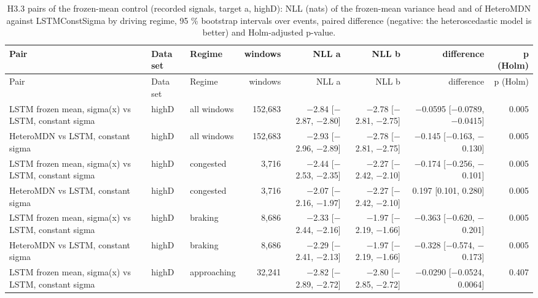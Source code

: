 \begingroup
\footnotesize
\begin{longtable}{lllrrrrr}
\caption{H3.3 pairs of the frozen-mean control (recorded signals, target a, highD): NLL (nats) of the frozen-mean variance head and of HeteroMDN against LSTMConstSigma by driving regime, 95 \% bootstrap intervals over events, paired difference (negative: the heteroscedastic model is better) and Holm-adjusted p-value.}\label{tab:t3-h33-nll--ctrl--a--event} \\
\toprule
Pair & Data set & Regime & windows & NLL a & NLL b & difference & p (Holm) \\
\midrule
\endfirsthead
\toprule
Pair & Data set & Regime & windows & NLL a & NLL b & difference & p (Holm) \\
\midrule
\endhead
\bottomrule
\endlastfoot
LSTM frozen mean, sigma(x) vs LSTM, constant sigma & highD & all windows & 152,683 & $-$2.84 [$-$2.87, $-$2.80] & $-$2.78 [$-$2.81, $-$2.75] & $-$0.0595 [$-$0.0789, $-$0.0415] & 0.005 \\
\midrule
HeteroMDN vs LSTM, constant sigma & highD & all windows & 152,683 & $-$2.93 [$-$2.96, $-$2.89] & $-$2.78 [$-$2.81, $-$2.75] & $-$0.145 [$-$0.163, $-$0.130] & 0.005 \\
\midrule
LSTM frozen mean, sigma(x) vs LSTM, constant sigma & highD & congested & 3,716 & $-$2.44 [$-$2.53, $-$2.35] & $-$2.27 [$-$2.42, $-$2.10] & $-$0.174 [$-$0.256, $-$0.101] & 0.005 \\
\midrule
HeteroMDN vs LSTM, constant sigma & highD & congested & 3,716 & $-$2.07 [$-$2.16, $-$1.97] & $-$2.27 [$-$2.42, $-$2.10] & 0.197 [0.101, 0.280] & 0.005 \\
\midrule
LSTM frozen mean, sigma(x) vs LSTM, constant sigma & highD & braking & 8,686 & $-$2.33 [$-$2.44, $-$2.16] & $-$1.97 [$-$2.19, $-$1.66] & $-$0.363 [$-$0.620, $-$0.201] & 0.005 \\
\midrule
HeteroMDN vs LSTM, constant sigma & highD & braking & 8,686 & $-$2.29 [$-$2.41, $-$2.13] & $-$1.97 [$-$2.19, $-$1.66] & $-$0.328 [$-$0.574, $-$0.173] & 0.005 \\
\midrule
LSTM frozen mean, sigma(x) vs LSTM, constant sigma & highD & approaching & 32,241 & $-$2.82 [$-$2.89, $-$2.72] & $-$2.80 [$-$2.85, $-$2.72] & $-$0.0290 [$-$0.0524, 0.0064] & 0.407 \\

\end{longtable}
